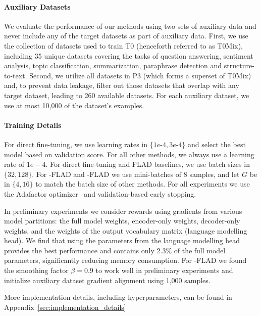 \paragraph{Auxiliary Datasets}
We evaluate the performance of our methods using two sets of auxiliary data and never include any of the target datasets as part of auxiliary data.
First, we use the collection of datasets used to train T0 (henceforth referred to as T0Mix), including 35 unique datasets covering the tasks of question answering, sentiment analysis, topic classification, summarization, paraphrase detection and structure-to-text.
Second, we utilize all datasets in P3 (which forms a superset of T0Mix) and, to prevent data leakage, filter out those datasets that overlap with any target dataset, leading to 260 available datasets. For each auxiliary dataset, we use at most 10,000 of the dataset's examples.

\paragraph{Training Details}
For direct fine-tuning, we use learning rates in $\{1e$-$4, 3e$-$4\}$ and select the best model based on validation score. For all other methods, we always use a learning rate of $1e-4$. For direct fine-tuning and FLAD baselines, we use batch sizes in $\{32,128\}$. For \ex{}-FLAD and \ucb{}-FLAD we use mini-batches of 8 samples, and let $G$ be in $\{4,16\}$ to match the batch size of other methods. For all experiments we use the Adafactor optimizer~\citep{pmlr-v80-shazeer18a} and validation-based early stopping.

In preliminary experiments we consider rewards using gradients from various model partitions: the full model weights, encoder-only weights, decoder-only weights, and the weights of the output vocabulary matrix (language modelling head). We find that using the parameters from the language modelling head provides the best performance and contains only 2.3\% of the full model parameters, significantly reducing memory consumption.
For \ucb{}-FLAD we found the smoothing factor $\beta=0.9$ to work well in preliminary experiments and initialize auxiliary dataset gradient alignment using 1,000 samples.


More implementation details, including hyperparameters, can be found in Appendix~\ref{sec:implementation_details}
